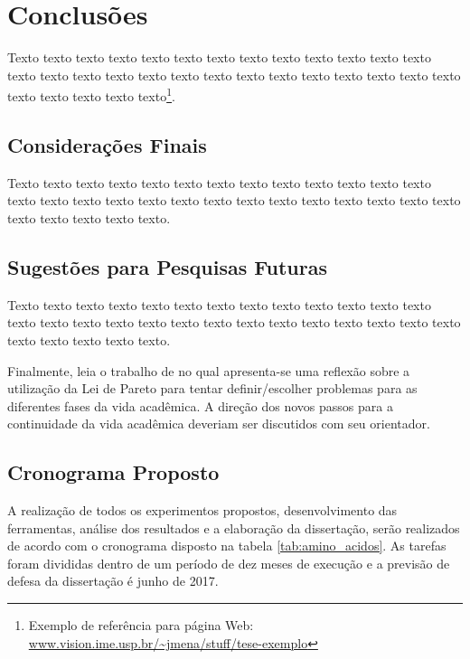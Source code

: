 \chapter{Conclusões}
\label{cap:conclusoes}

Texto texto texto texto texto texto texto texto texto texto texto texto texto
texto texto texto texto texto texto texto texto texto texto texto texto texto
texto texto texto texto texto texto\footnote{Exemplo de referência para página
Web: \url{www.vision.ime.usp.br/~jmena/stuff/tese-exemplo}}.

\section{Considerações Finais} 

Texto texto texto texto texto texto texto texto texto texto texto texto texto
texto texto texto texto texto texto texto texto texto texto texto texto texto
texto texto texto texto texto texto. 

\section{Sugestões para Pesquisas Futuras} 

Texto texto texto texto texto texto texto texto texto texto texto texto texto
texto texto texto texto texto texto texto texto texto texto texto texto texto
texto texto texto texto texto texto.

Finalmente, leia o trabalho de \citet{alon09:how} no qual apresenta-se
uma reflexão sobre a utilização da Lei de Pareto para tentar definir/escolher
problemas para as diferentes fases da vida acadêmica.  A direção dos novos
passos para a continuidade da vida acadêmica deveriam ser discutidos com seu
orientador.

\section{Cronograma Proposto}
A realização de todos os experimentos propostos, desenvolvimento das ferramentas,
análise dos resultados e a elaboração da dissertação, serão realizados de acordo
com o cronograma disposto na tabela \ref{tab:amino_acidos}. As tarefas foram divididas
dentro de um período de dez meses de execução e a previsão de defesa da dissertação é junho
de 2017.

